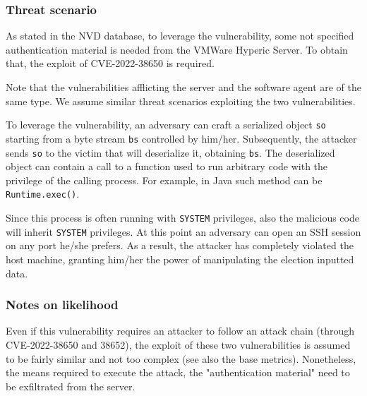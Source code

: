 \subsubsection*{Threat scenario}

As stated in the NVD database\cite{online:cve-2022-38652}, to leverage the vulnerability, some not specified authentication material is needed from the VMWare Hyperic Server. To obtain that, the exploit of CVE-2022-38650 is required.

Note that the vulnerabilities afflicting the server and the software agent are of the same type\cite{online:cve-2022-38650}. We assume similar threat scenarios exploiting the two vulnerabilities.

To leverage the vulnerability, an adversary can craft a serialized object \texttt{so} starting from a byte stream \texttt{bs} controlled by him/her. Subsequently, the attacker sends \texttt{so} to the victim that will deserialize it, obtaining \texttt{bs}. The deserialized object can contain a call to a function used to run arbitrary code with the privilege of the calling process\cite{artile:Java_Deserialization_Remote-Code_Execution}. For example, in Java such method can be \texttt{Runtime.exec()}.

Since this process is often running with \texttt{SYSTEM} privileges\cite{online:cve-2022-38652}, also the malicious code will inherit \texttt{SYSTEM} privileges. At this point an adversary can open an SSH session on any port he/she prefers. As a result, the attacker has completely violated the host machine, granting him/her the power of manipulating the election inputted data.

\subsubsection*{Notes on likelihood}

Even if this vulnerability requires an attacker to follow an attack chain (through CVE-2022-38650 and 38652), the exploit of these two vulnerabilities is assumed to be fairly similar and not too complex (see also the base metrics). Nonetheless, the means required to execute the attack, the "authentication material" need to be exfiltrated from the server.


